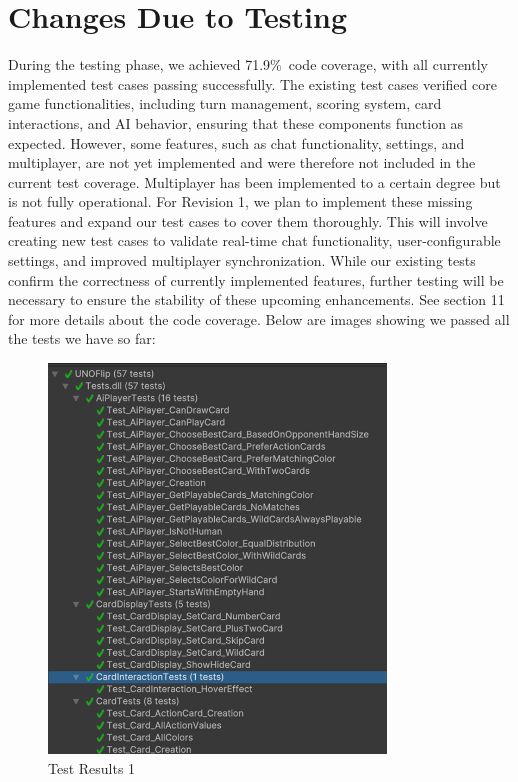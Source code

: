 \documentclass[12pt, titlepage]{article}
\begin{document}
\section{Changes Due to Testing}
During the testing phase, we achieved 71.9\%\ code coverage, with all currently implemented test cases passing successfully. The existing test cases verified core game functionalities, including turn management, scoring system, card interactions, and AI behavior, ensuring that these components function as expected. However, some features, such as chat functionality, settings, and multiplayer, are not yet implemented and were therefore not included in the current test coverage. Multiplayer has been implemented to a certain degree but is not fully operational. For Revision 1, we plan to implement these missing features and expand our test cases to cover them thoroughly. This will involve creating new test cases to validate real-time chat functionality, user-configurable settings, and improved multiplayer synchronization. While our existing tests confirm the correctness of currently implemented features, further testing will be necessary to ensure the stability of these upcoming enhancements. See section 11 for more details about the code coverage. Below are images showing we passed all the tests we have so far:
\begin{figure}[H]
    \centering
    \includegraphics[width=0.8\textwidth]{passedTests1.png}
    \caption{Test Results 1}
    \label{fig:test_results_1}
\end{figure}
\end{document}
